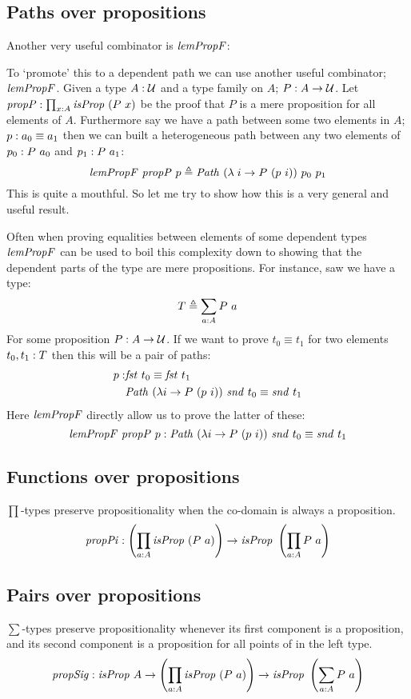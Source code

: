 \subsection{Paths over propositions}
\label{sec:lemPropF}
Another very useful combinator is $\lemPropF$:

To `promote' this to a dependent path we can use another useful combinator;
$\lemPropF$. Given a type $A \mathrel{:} \mathcal{U}$ and a type family on $A$; $P \mathrel{:} A \to
\mathcal{U}$. Let $\var{propP} \tp \prod_{x \tp A} \isProp\ (P\ x)$ be the proof that
$P$ is a mere proposition for all elements of $A$. Furthermore say we have a
path between some two elements in $A$; $p \mathrel{:} a_0 \equiv a_1$ then we can built
a heterogeneous path between any two elements of $p_0 \mathrel{:} P\ a_0$ and $p_1 \mathrel{:}
P\ a_1$:
%
$$
\lemPropF\ \var{propP}\ p \defeq \Path\ (\lambda\; i \mto P\ (p\ i))\ p_0\ p_1
$$
%
This is quite a mouthful. So let me try to show how this is a very general and
useful result.

Often when proving equalities between elements of some dependent types
$\lemPropF$ can be used to boil this complexity down to showing that the
dependent parts of the type are mere propositions. For instance, saw we have a type:
%
$$
T \mathrel{\triangleq} \sum_{a \mathrel{:} A} P\ a
$$
%
For some proposition $P \mathrel{:} A \to \mathcal{U}$. If we want to prove $t_0 \equiv t_1$
for two elements $t_0, t_1 \mathrel{:} T$ then this will be a pair of paths:
%
%
\begin{align*}
  p \tp & \fst\ t_0 \equiv \fst\ t_1 \\
        & \Path\ (\lambda i \to P\ (p\ i))\ \snd\ t_0 \equiv \snd\ t_1
\end{align*}
%
Here $\lemPropF$ directly allow us to prove the latter of these:
%
$$
\lemPropF\ \var{propP}\ p
  \tp \Path\ (\lambda i \to P\ (p\ i))\ \snd\ t_0 \equiv \snd\ t_1
$$
%
\subsection{Functions over propositions}
\label{sec:propPi}
$\prod$-types preserve propositionality when the co-domain is always a
proposition.
%
$$
\mathit{propPi} \tp \left(\prod_{a \tp A} \isProp\ (P\ a)\right) \to \isProp\ \left(\prod_{a \tp A} P\ a\right)
$$
\subsection{Pairs over propositions}
\label{sec:propSig}
%
$\sum$-types preserve propositionality whenever its first component is a
proposition, and its second component is a proposition for all points of in the
left type.
%
$$
\mathit{propSig} \tp \isProp\ A \to \left(\prod_{a \tp A} \isProp\ (P\ a)\right) \to \isProp\ \left(\sum_{a \tp A} P\ a\right)
$$
